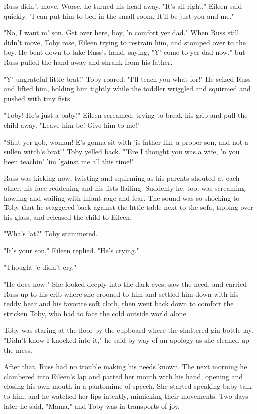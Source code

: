 Russ didn't move. Worse, he turned his head away. "It's all right," Eileen said quickly. "I can put him to bed in the small room. It'll be just you and me."

"No, I want m' son. Get over here, boy, 'n comfort yer dad." When Russ still didn't move, Toby rose, Eileen trying to restrain him, and stomped over to the boy. He bent down to take Russ's hand, saying, "Y' come to yer dad now," but Russ pulled the hand away and shrank from his father.

"Y' ungrateful little brat!" Toby roared. "I'll teach you what for!" He seized Russ and lifted him, holding him tightly while the toddler wriggled and squirmed and pushed with tiny fists.

"Toby! He's just a baby!" Eileen screamed, trying to break his grip and pull the child away. "Leave him be! Give him to me!"

"Shut yer gob, woman! E's gonna sit with 'is father like a proper son, and not a sullen witch's brat!" Toby yelled back. "'Ere I thought you was a wife, 'n you been teachin' 'im 'gainst me all this time!"

Russ was kicking now, twisting and squirming as his parents shouted at each other, his face reddening and his fists flailing. Suddenly he, too, was screaming—howling and wailing with infant rage and fear. The sound was so shocking to Toby that he staggered back against the little table next to the sofa, tipping over his glass, and released the child to Eileen.

"Wha's 'at?" Toby stammered.

"It's your son," Eileen replied. "He's crying."

"Thought 'e didn't cry."

"He does now." She looked deeply into the dark eyes, saw the need, and carried Russ up to his crib where she crooned to him and settled him down with his teddy bear and his favorite soft cloth, then went back down to comfort the stricken Toby, who had to face the cold outside world alone.

Toby was staring at the floor by the cupboard where the shattered gin bottle lay. "Didn't know I knocked into it," he said by way of an apology as she cleaned up the mess.

After that, Russ had no trouble making his needs known. The next morning he clambered into Eileen's lap and patted her mouth with his hand, opening and closing his own mouth in a pantomime of speech. She started speaking baby-talk to him, and he watched her lips intently, mimicking their movements. Two days later he said, "Mama," and Toby was in transports of joy.

